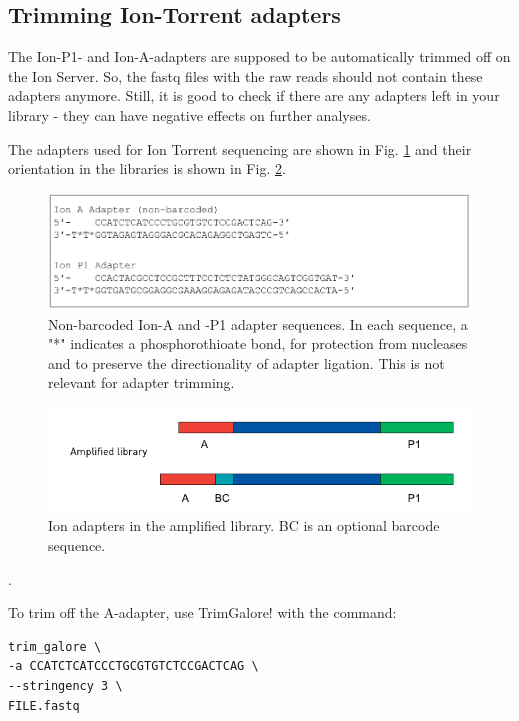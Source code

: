 \documentclass[11pt]{article}
\begin{document}
\subsection{Trimming Ion-Torrent adapters}
\label{sec-3-1}

The Ion-P1- and Ion-A-adapters are supposed to be automatically
trimmed off on the Ion Server. So, the fastq files with the raw reads
should not contain these adapters anymore. Still, it is good to check
if there are any adapters left in your library - they can have
negative effects on further analyses.



The adapters used for Ion Torrent sequencing are shown in
Fig. \ref{fig:ionadapters} and their orientation in the libraries is shown
in Fig. \ref{fig:adapterorientations}.

\begin{figure}[htb]
\centering
\includegraphics[width=14cm]{IonAdapters.png}
\caption{\label{fig:ionadapters}Non-barcoded Ion-A and -P1 adapter sequences. In each sequence, a "*" indicates a phosphorothioate bond, for protection from nucleases and to preserve the directionality of adapter ligation. This is not relevant for adapter trimming.}
\end{figure}

\begin{figure}[htb]
\centering
\includegraphics[width=14cm]{IonLibraryWithAdapters.png}
\caption{\label{fig:adapterorientations}Ion adapters in the amplified library. BC is an optional barcode sequence.}
\end{figure}.

To trim off the A-adapter, use TrimGalore! with the command:

\begin{verbatim}
trim_galore \
-a CCATCTCATCCCTGCGTGTCTCCGACTCAG \
--stringency 3 \
FILE.fastq
\end{verbatim}
\end{document}
